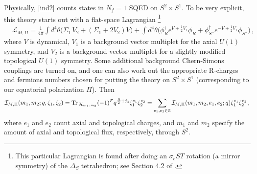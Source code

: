 \documentclass[11pt,letterpaper]{article}
\numberwithin{equation}{section}
\newcommand{\be}{\begin{equation}}
\newcommand{\ee}{\end{equation}}
\newcommand{\Z}{{\mathbb Z}}
\newcommand{\Tr}{{\rm Tr \,}}
\newcommand{\CH}{\mathcal{H}}
\newcommand{\CI}{\mathcal{I}}
\newcommand{\CL}{\mathcal{L}}
\begin{document}
Physically, \eqref{ind2} counts states in $N_f=1$ SQED on $S^2\times S^1$. To be very explicit, this theory starts out with a flat-space Lagrangian%
%
\footnote{This particular Lagrangian is found after doing an $\sigma_eST$ rotation (a mirror symmetry) of the $\Delta_S$ tetrahedron; see Section 4.2 of \cite{DGG}.} %
%
\begin{align} &\CL_{M,\Pi} = \frac{1}{4\pi}\int d^4\theta\big( \Sigma_1\,V_2+(\Sigma_1+2 V_2)V\big) +\int d^4\theta \big(\phi_R^\dagger e^{V+\frac12 V_1}\phi_R + \phi_{S''}^\dagger e^{-V+\frac12 V_1}\phi_{S''}\big)\,,
\end{align}
%
where $V$ is dynamical, $V_1$ is a background vector multiplet for the axial $U(1)$ symmetry, and $V_2$ is a background vector multiplet for a slightly modified topological $U(1)$ symmetry. Some additional background Chern-Simons couplings are turned on, and one can also work out the appropriate R-charges and fermions numbers chosen for putting the theory on $S^2\times S^1$ (corresponding to our equatorial polarization $\Pi$). Then
%
\be \CI_{M,\Pi}(m_1,m_2;q,\zeta_1,\zeta_2) = \Tr_{\CH_{m_1,m_2}} (-1)^F q^{\frac{R}2+j_3}\zeta_1^{e_1}\zeta_2^{e_2} = \sum_{e_1,e_2\in \Z} \CI_{M,\Pi}(m_1,m_2,e_1,e_2;q)\zeta_1^{e_1}\zeta_2^{e_2}\,,\ee
%
where $e_1$ and $e_2$ count axial and topological charges, and $m_1$ and $m_2$ specify the amount of axial and topological flux, respectively, through $S^2$.
\end{document}
